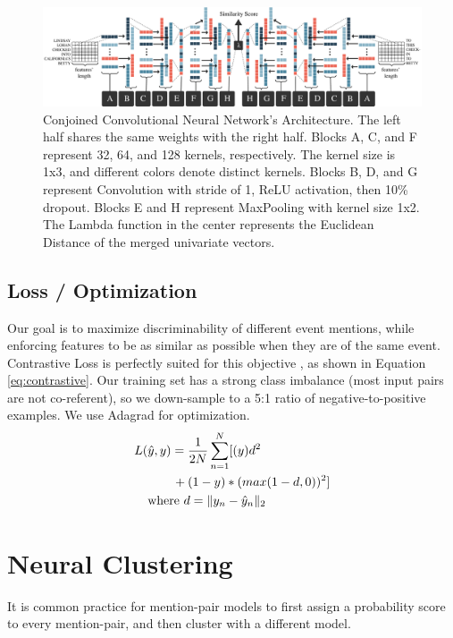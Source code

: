 \documentclass[11pt,a4paper]{article}
\begin{document}
\begin{figure}[h]
\centering
	\includegraphics[width=1\textwidth]{architecture.pdf}
	\caption{Conjoined Convolutional Neural Network's Architecture.  The left half shares the same weights with the right half.  Blocks A, C, and F represent 32, 64, and 128 kernels, respectively.  The kernel size is 1x3, and different colors denote distinct kernels.  Blocks B, D, and G represent Convolution with stride of 1, ReLU activation, then 10\% dropout.  Blocks E and H represent MaxPooling with kernel size 1x2.  The Lambda function in the center represents the Euclidean Distance of the merged univariate vectors.}
	\label{fig:ccnn}
\end{figure}

\subsection{Loss / Optimization}
Our goal is to maximize discriminability of different event mentions, while enforcing features to be as similar as possible when they are of the same event.  Contrastive Loss is perfectly suited for this objective \cite{SchroffKP15,pmlr-v48-liud16}, as shown in Equation \ref{eq:contrastive}. Our training set has a strong class imbalance (most input pairs are not co-referent), so we down-sample to a 5:1 ratio of negative-to-positive examples.  We use Adagrad for optimization.
\begin{equation}
\begin{aligned}
L(&\hat{y},y)=\frac{1}{2N}\sum_{n=1}^{N}[(y)d^2 \\
&\qquad {} + (1-y)*(max(1-d,0))^2] \\
&\textnormal{where }d=\|y_{n}-\hat{y}_{n}\|_{2}
\end{aligned}
\label{eq:contrastive}
\end{equation}

\section{Neural Clustering}
\label{sec:clustering}
It is common practice for mention-pair models to first assign a probability score to every mention-pair, and then cluster with a different model.
\end{document}
